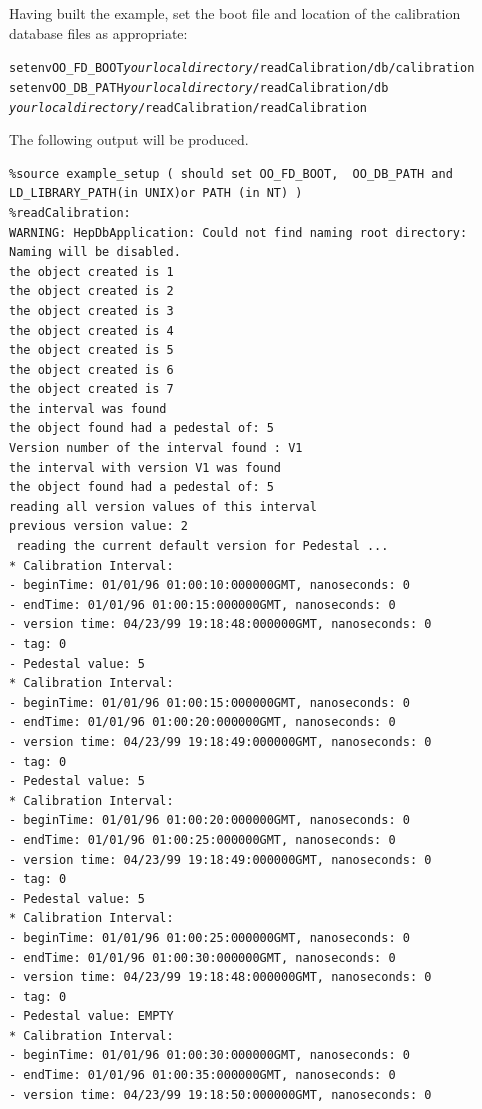 \par

Having built the example, set the boot file and location of the calibration
database files as appropriate:
\begin{alltt}

setenv OO_FD_BOOT \emph{your local directory}/readCalibration/db/calibration 
setenv OO_DB_PATH \emph{your local directory}/readCalibration/db 
 \emph{your local directory}/readCalibration/readCalibration 

\end{alltt}

\par

The following output will be produced.
\begin{verbatim}
%source example_setup ( should set OO_FD_BOOT,  OO_DB_PATH and LD_LIBRARY_PATH(in UNIX)or PATH (in NT) ) 
%readCalibration: 
WARNING: HepDbApplication: Could not find naming root directory: Naming will be disabled. 
the object created is 1 
the object created is 2 
the object created is 3 
the object created is 4 
the object created is 5 
the object created is 6 
the object created is 7 
the interval was found 
the object found had a pedestal of: 5 
Version number of the interval found : V1 
the interval with version V1 was found 
the object found had a pedestal of: 5 
reading all version values of this interval 
previous version value: 2 
 reading the current default version for Pedestal ... 
* Calibration Interval: 
- beginTime: 01/01/96 01:00:10:000000GMT, nanoseconds: 0 
- endTime: 01/01/96 01:00:15:000000GMT, nanoseconds: 0 
- version time: 04/23/99 19:18:48:000000GMT, nanoseconds: 0 
- tag: 0 
- Pedestal value: 5 
* Calibration Interval: 
- beginTime: 01/01/96 01:00:15:000000GMT, nanoseconds: 0 
- endTime: 01/01/96 01:00:20:000000GMT, nanoseconds: 0 
- version time: 04/23/99 19:18:49:000000GMT, nanoseconds: 0 
- tag: 0 
- Pedestal value: 5 
* Calibration Interval: 
- beginTime: 01/01/96 01:00:20:000000GMT, nanoseconds: 0 
- endTime: 01/01/96 01:00:25:000000GMT, nanoseconds: 0 
- version time: 04/23/99 19:18:49:000000GMT, nanoseconds: 0 
- tag: 0 
- Pedestal value: 5 
* Calibration Interval: 
- beginTime: 01/01/96 01:00:25:000000GMT, nanoseconds: 0 
- endTime: 01/01/96 01:00:30:000000GMT, nanoseconds: 0 
- version time: 04/23/99 19:18:48:000000GMT, nanoseconds: 0 
- tag: 0 
- Pedestal value: EMPTY 
* Calibration Interval: 
- beginTime: 01/01/96 01:00:30:000000GMT, nanoseconds: 0 
- endTime: 01/01/96 01:00:35:000000GMT, nanoseconds: 0 
- version time: 04/23/99 19:18:50:000000GMT, nanoseconds: 0 

\end{verbatim}
